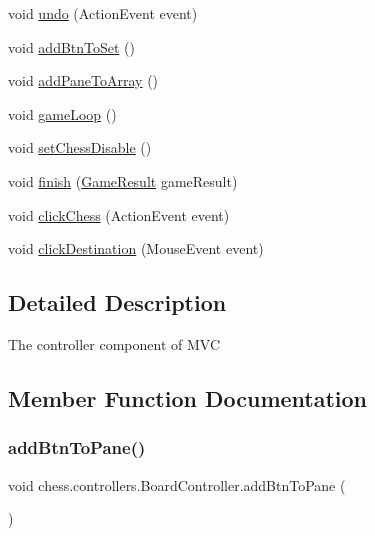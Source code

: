 \begin{DoxyCompactItemize}
void \mbox{\hyperlink{classchess_1_1controllers_1_1_board_controller_a5ba6c93ec1dbe97eb07a5fefe7cd39c5}{undo}} (Action\+Event event)
\item 
void \mbox{\hyperlink{classchess_1_1controllers_1_1_board_controller_ab0a4ca512dc7bdcdbe7805e5f47dcc6d}{add\+Btn\+To\+Set}} ()
\item 
void \mbox{\hyperlink{classchess_1_1controllers_1_1_board_controller_a8182ba3079233a2e1761678fdd8832b0}{add\+Pane\+To\+Array}} ()
\item 
void \mbox{\hyperlink{classchess_1_1controllers_1_1_board_controller_a6c22f6646f001c3ac2e255e1ad042179}{game\+Loop}} ()
\item 
void \mbox{\hyperlink{classchess_1_1controllers_1_1_board_controller_a6b6dfa8a50a88faa082014c01b0b49cf}{set\+Chess\+Disable}} ()
\item 
void \mbox{\hyperlink{classchess_1_1controllers_1_1_board_controller_abb3a608cfc953e6f0e11a274bfb7f1f8}{finish}} (\mbox{\hyperlink{enumchess_1_1models_1_1enums_1_1_game_result}{Game\+Result}} game\+Result)
\item 
void \mbox{\hyperlink{classchess_1_1controllers_1_1_board_controller_a5eefc99457d38fb2c091eeb674d337e5}{click\+Chess}} (Action\+Event event)
\item 
void \mbox{\hyperlink{classchess_1_1controllers_1_1_board_controller_a0cfbeef7ff00ff604806817044c2051f}{click\+Destination}} (Mouse\+Event event)
\end{DoxyCompactItemize}


\subsection{Detailed Description}
The controller component of M\+VC 

\subsection{Member Function Documentation}
\mbox{\label{classchess_1_1controllers_1_1_board_controller_ab576456eca49c7f7e65c1aaaa5317b39}} 
\subsubsection{\texorpdfstring{add\+Btn\+To\+Pane()}{addBtnToPane()}}
{\footnotesize\ttfamily void chess.\+controllers.\+Board\+Controller.\+add\+Btn\+To\+Pane (\begin{DoxyParamCaption}{ }\end{DoxyParamCaption})}

